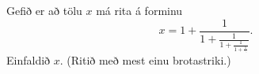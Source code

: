 Gefið er að tölu $x$ má rita á forminu
\[
x=1+\frac{1}{1+\frac{1}{1+\frac{1}{1+\frac1{\ddots}}}}.
\]
Einfaldið $x$. (Ritið með mest einu brotastriki.)

